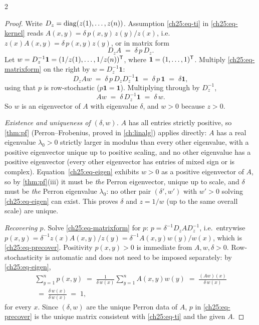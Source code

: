 \begin{paracol}{2}
\begin{proof}
Write $D_z=\operatorname{diag}(z(1),\dots,z(n))$. Assumption \eqref{ch25:eq-ti} in \eqref{ch25:eq-kernel} reads
$A(x,y)=\delta\,p(x,y)\,z(y)/z(x)$, i.e.\ $z(x)A(x,y)=\delta\,p(x,y)z(y)$, or in matrix form
\begin{equation}\label{ch25:eq-matrixform}
  D_zA \;=\; \delta\,p\,D_z .
\end{equation}
Let $w=D_z^{-1}\bm1=(1/z(1),\dots,1/z(n))^{\mathsf T}$, where $\bm1=(1,\dots,1)^{\mathsf T}$. Multiply \eqref{ch25:eq-matrixform}
on the right by $w=D_z^{-1}\bm1$:
\[
  D_zAw \;=\; \delta\,p\,D_zD_z^{-1}\bm1 \;=\; \delta\,p\,\bm1 \;=\; \delta\bm1,
\]
using that $p$ is row-stochastic ($p\bm1=\bm1$). Multiplying through by $D_z^{-1}$,
\begin{equation}\label{ch25:eq-eigen}
  Aw \;=\; \delta\,D_z^{-1}\bm1 \;=\; \delta\,w .
\end{equation}
So $w$ is an eigenvector of $A$ with eigenvalue $\delta$, and $w>0$ because $z>0$.

\emph{Existence and uniqueness of $(\delta,w)$.} $A$ has all entries strictly positive, so
\cref{thm:pf} (Perron--Frobenius, proved in \cref{ch:linalg}) applies directly: $A$ has a real eigenvalue
$\lambda_0>0$ strictly larger in modulus than every other eigenvalue, with a positive eigenvector unique up
to positive scaling, and no other eigenvalue has a positive eigenvector (every other eigenvector has entries
of mixed sign or is complex). Equation~\eqref{ch25:eq-eigen} exhibits $w>0$ as a positive eigenvector of
$A$, so by \cref{thm:pf}(iii) it must be \emph{the} Perron eigenvector, unique up to scale, and $\delta$
must be \emph{the} Perron eigenvalue $\lambda_0$: no other pair $(\delta',w')$ with $w'>0$ solving
\eqref{ch25:eq-eigen} can exist. This proves $\delta$ and $z=1/w$ (up to the same overall scale) are unique.

\emph{Recovering $p$.} Solve \eqref{ch25:eq-matrixform} for $p$: $p=\delta^{-1}D_zAD_z^{-1}$, i.e.\ entrywise
$p(x,y)=\delta^{-1}z(x)A(x,y)/z(y)=\delta^{-1}A(x,y)w(y)/w(x)$, which is \eqref{ch25:eq-precover}. Positivity
$p(x,y)>0$ is immediate from $A,w,\delta>0$. Row-stochasticity is automatic and does not need to be imposed
separately: by \eqref{ch25:eq-eigen},
\[
\begin{gathered}
  \sum_{y=1}^np(x,y) \;=\; \frac{1}{\delta\,w(x)}\sum_{y=1}^nA(x,y)w(y) \;=\; \frac{(Aw)(x)}{\delta\,w(x)} \\
  \;=\; \frac{\delta\,w(x)}{\delta\,w(x)} \;=\; 1,
\end{gathered}
\]
for every $x$. Since $(\delta,w)$ are the unique Perron data of $A$, $p$ in \eqref{ch25:eq-precover} is the
unique matrix consistent with \eqref{ch25:eq-ti} and the given $A$.
\end{proof}


\end{paracol}
